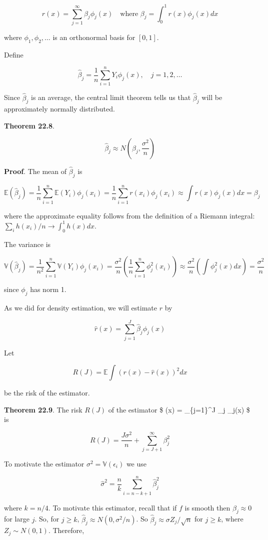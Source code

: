 \[
r(x) = \sum_{j=1}^\infty \beta_j \phi_j(x)
\quad \text{where } \beta_j = \int_0^1 r(x) \phi_j(x) dx
\]

where \(\phi_1, \phi_2, \dots\) is an orthonormal basis for \([0, 1]\).

Define

\[ \hat{\beta}_j = \frac{1}{n} \sum_{i=1}^n Y_i \phi_j(x), 
\quad j = 1, 2, \dots\]

Since \(\hat{\beta}_j\) is an average, the central limit theorem tells
us that \(\hat{\beta}_j\) will be approximately normally distributed.

\textbf{Theorem 22.8}.

\[ \hat{\beta}_j \approx N \left( \beta_j, \frac{\sigma^2}{n} \right) \]

\textbf{Proof}. The mean of \(\hat{\beta}_j\) is

\[ \mathbb{E}(\hat{\beta}_j) = \frac{1}{n} \sum_{i=1}^n \mathbb{E}(Y_i) \phi_j(x_i) = \frac{1}{n} \sum_{i=1}^n r(x_i) \phi_j(x_i) \approx \int r(x) \phi_j(x) dx = \beta_j\]

where the approximate equality follows from the definition of a Riemann
integral: \(\sum_i h(x_i) / n \rightarrow \int_0^1 h(x) dx\).

The variance is

\[ \mathbb{V}(\hat{\beta}_j) = \frac{1}{n^2} \sum_{i=1}^n \mathbb{V}(Y_i) \phi_j(x_i) = \frac{\sigma^2}{n} \left( \frac{1}{n} \sum_{i=1}^n \phi_j^2(x_i) \right) \approx \frac{\sigma^2}{n} \left( \int \phi_j^2(x) dx \right) = \frac{\sigma^2}{n}\]

since \(\phi_j\) has norm 1.

As we did for density estimation, we will estimate \(r\) by

\[ \hat{r}(x) = \sum_{j=1}^J \hat{\beta}_j \phi_j(x) \]

Let

\[ R(J) = \mathbb{E} \int (r(x) - \hat{r}(x))^2 dx \]

be the risk of the estimator.

\textbf{Theorem 22.9}. The risk \(R(J)\) of the estimator \$ (x)
= \sum\_\{j=1\}\^{}J \hat{\beta}\_j \phi\_j(x) \$ is

\[ R(J) = \frac{J \sigma^2}{n} + \sum_{j=J+1}^\infty \beta_j^2 \]

To motivate the estimator \(\sigma^2 = \mathbb{V}(\epsilon_i)\) we use

\[ \hat{\sigma}^2 = \frac{n}{k} \sum_{i=n - k + 1}^n \hat{\beta}_j^2 \]

where \(k = n / 4\). To motivate this estimator, recall that if \(f\) is
smooth then \(\beta_j \approx 0\) for large \(j\). So, for \(j \geq k\),
\(\hat{\beta}_j \approx N(0, \sigma^2 / n)\). So
\(\hat{\beta}_j \approx \sigma Z_j / \sqrt{n}\) for \(j \geq k\), where
\(Z_j \sim N(0, 1)\). Therefore,

